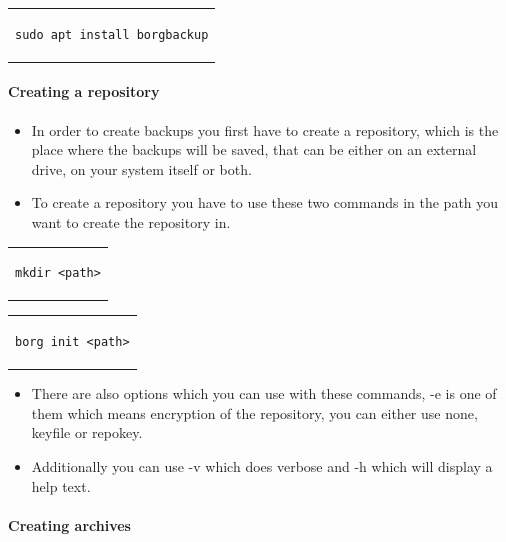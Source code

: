 \documentclass[a4paper,10pt]{article}
\begin{document}
\begin{center}
\begin{tabular}{c}
\begin{lstlisting}
sudo apt install borgbackup
\end{lstlisting}
\end{tabular}
\end{center}

\paragraph{Creating a repository}

\begin{itemize}[leftmargin=*]
\item In order to create backups you first have to create a repository, which is the place where the backups will be saved, that can be either on an external drive, on your system itself or both.
\item To create a repository you have to use these two commands in the path you want to create the repository in.
\end{itemize}

\begin{center}
\begin{tabular}{c}
\begin{lstlisting}
mkdir <path>
\end{lstlisting}
\end{tabular}
\end{center}

\begin{center}
\begin{tabular}{c}
\begin{lstlisting}
borg init <path>
\end{lstlisting}
\end{tabular}
\end{center}

\begin{itemize}[leftmargin=*]
\item There are also options which you can use with these commands, -e is one of them which means encryption of the repository, you can either use none, keyfile or repokey.
\item Additionally you can use -v which does verbose and -h which will display a help text.
\end{itemize}

\paragraph{Creating archives}
\end{document}
